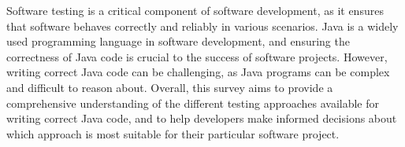 Software testing is a critical component of software development, as it ensures that software behaves correctly and reliably in various scenarios. Java is a widely used programming language in software development, and ensuring the correctness of Java code is crucial to the success of software projects. However, writing correct Java code can be challenging, as Java programs can be complex and difficult to reason about. Overall, this survey aims to provide a comprehensive understanding of the different testing approaches available for writing correct Java code, and to help developers make informed decisions about which approach is most suitable for their particular software project.